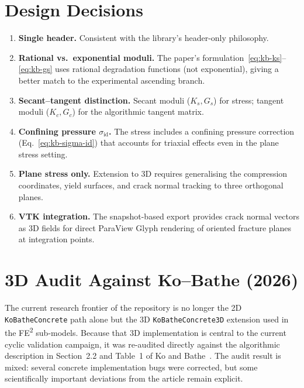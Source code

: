 \section{Design Decisions}
\label{sec:kb-design-notes}

\begin{enumerate}
  \item \textbf{Single header.}  Consistent with the library's
        header-only philosophy.

  \item \textbf{Rational vs.\ exponential moduli.}  The paper's
        formulation~\eqref{eq:kb-ks}--\eqref{eq:kb-gs} uses rational
        degradation functions (not exponential), giving a better match to
        the experimental ascending branch.

  \item \textbf{Secant--tangent distinction.}  Secant moduli ($K_s, G_s$)
        for stress; tangent moduli ($K_c, G_c$) for the algorithmic
        tangent matrix.

  \item \textbf{Confining pressure $\sigma_{\text{id}}$.}  The stress
        includes a confining pressure correction (Eq.~\eqref{eq:kb-sigma-id})
        that accounts for triaxial effects even in the plane stress setting.

  \item \textbf{Plane stress only.}  Extension to 3D requires
        generalising the compression coordinates, yield surfaces, and
        crack normal tracking to three orthogonal planes.

  \item \textbf{VTK integration.}  The snapshot-based export provides
        crack normal vectors as 3D fields for direct ParaView Glyph rendering of
        oriented fracture planes at integration points.
\end{enumerate}

\section{3D Audit Against Ko--Bathe (2026)}
\label{sec:kb-3d-audit}

The current research frontier of the repository is no longer the 2D
\texttt{KoBatheConcrete} path alone but the 3D
\texttt{KoBatheConcrete3D} extension used in the FE\textsuperscript{2}
sub-models.  Because that 3D implementation is central to the current cyclic
validation campaign, it was re-audited directly against the algorithmic
description in Section~2.2 and Table~1 of Ko and
Bathe~\cite{KoBathe2026}.  The audit result is mixed: several concrete
implementation bugs were corrected, but some scientifically important
deviations from the article remain explicit.

